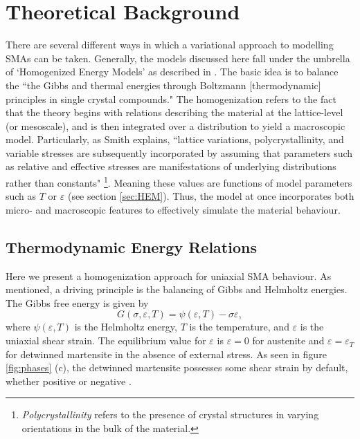 \chapter{Theoretical Background}\label{ch:2}
\begin{multicols}{2}

There are several different ways in which a variational approach to modelling SMAs can be taken. Generally, the models discussed here fall under the umbrella of `Homogenized Energy Models' as described in \cite{smith2005smart}. The basic idea is to balance the ``the Gibbs and thermal energies through Boltzmann [thermodynamic] principles in single crystal compounds." The homogenization refers to the fact that the theory begins with relations describing the material at the lattice-level (or mesoscale), and is then integrated over a distribution to yield a macroscopic model. Particularly, as Smith explains, ``lattice variations, polycrystallinity, and variable stresses are subsequently incorporated by assuming that parameters such as relative and effective stresses are manifestations of underlying distributions rather than constants" \cite{smith2005smart}\footnote{\textit{Polycrystallinity} refers to the presence of crystal structures in varying orientations in the bulk of the material.}. Meaning these values are functions of model parameters such as $T$ or $\varepsilon$ (see section \ref{sec:HEM}). Thus, the model at once incorporates both micro- and macroscopic features to effectively simulate the material behaviour. 

\section{Thermodynamic Energy Relations} 
Here we present a homogenization approach for uniaxial SMA behaviour. As mentioned, a driving principle is the balancing of Gibbs and Helmholtz energies. The Gibbs free energy is given by
\begin{equation}
    G(\sigma, \varepsilon, T) = \psi(\varepsilon, T) - \sigma\varepsilon, \label{eq:01}
\end{equation}
where $\psi(\varepsilon, T)$ is the Helmholtz energy, $T$ is the temperature, and $\varepsilon$ is the uniaxial shear strain. The equilibrium value for $\varepsilon$ is $\varepsilon = 0$ for austenite and $\varepsilon = \varepsilon_T$ for detwinned martensite in the absence of external stress. As seen in figure \ref{fig:phases} (c), the detwinned martensite possesses some shear strain by default, whether positive or negative \cite{smith2005smart}.


\end{multicols}
